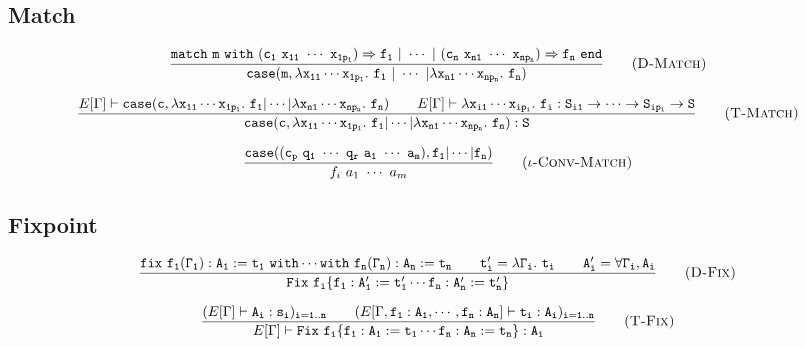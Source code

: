 \subsection{Match}
\begin{Def}
    \begin{equation*}
    \frac{\tt match\ m\ with\ (c_1\ x_{11}\ \cdots\ x_{1p_1})\Rightarrow f_1\ |\ \cdots\ |\ (c_n\ x_{n1}\ \cdots\ x_{np_n})
        \Rightarrow f_n\ end}
        {\tt case(m,\lambda x_{11}\cdots x_{1p_1}.\ f_1\ |\ \cdots\ |\lambda x_{n1}\cdots x_{np_n}.\ f_n)}
        \tag{\sc D-Match}
    \end{equation*}
\end{Def}

\begin{equation}
\frac{E[\Gamma]\vdash{\tt case(c,\lambda x_{11}\cdots x_{1p_1}.\ f_1|\cdots|\lambda x_{n1}\cdots x_{np_n}.\ f_n)}\qquad 
    E[\Gamma]\vdash{\tt \lambda x_{i1}\cdots x_{ip_i}.\ f_i:S_{i1}\to\cdots\to S_{ip_i}\to S}}
    {\tt case(c,\lambda x_{11}\cdots x_{1p_1}.\ f_1|\cdots|\lambda x_{n1}\cdots x_{np_n}.\ f_n):S}
    \tag{\sc T-Match}
\end{equation}

\begin{equation*}
\frac{\tt case((c_p\ q_1\ \cdots\ q_r\ a_1\ \cdots\ a_m),f_1|\cdots|f_n)}
    {f_i\ a_1\ \cdots\ a_m}
    \tag{\sc $\iota$-Conv-Match}
\end{equation*}

\subsection{Fixpoint}
\begin{Def}
    \begin{equation*}
    \frac{\tt fix\ f_1(\Gamma_1):A_1:=t_1\ with\cdots with\ f_n(\Gamma_n):A_n:=t_n\qquad 
        t'_i=\lambda\Gamma_i.\ t_i\qquad A'_i=\forall\Gamma_i,A_i}
        {\tt Fix\ f_i\{f_1:A'_1:=t'_1\cdots f_n:A'_n:=t'_n\}}
        \tag{\sc D-Fix}
    \end{equation*}
\end{Def}

\begin{equation*}
\frac{(E[\Gamma]\vdash {\tt A_i:s_i)_{i=1..n}}\qquad (E[\Gamma,\tt f_1:A_1,\cdots,f_n:A_n]\vdash t_i:A_i)_{i=1..n}}
    {E[\Gamma]\vdash\tt Fix\ f_i\{f_1:A_1:=t_1\cdots f_n:A_n:=t_n\}:A_i}
    \tag{\sc T-Fix}
\end{equation*}

